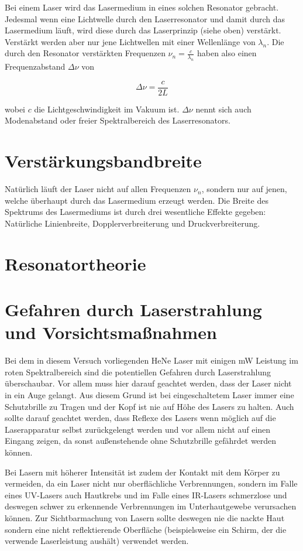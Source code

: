 \documentclass[bigchapter,colorback,accentcolor=tud4b,linedtoc,11pt]{tudreport}
\numberwithin{equation}{subsection}
\begin{document}
Bei einem Laser wird das Lasermedium in eines solchen Resonator gebracht. Jedesmal wenn eine Lichtwelle durch den Laserresonator und damit durch das Lasermedium läuft, wird diese durch das Laserprinzip (siehe oben) verstärkt. Verstärkt werden aber nur jene Lichtwellen mit einer Wellenlänge von \(\lambda_n\). Die durch den Resonator verstärkten Frequenzen \(\nu_n = \frac{c}{\lambda_n}\) haben also einen Frequenzabstand \(\Delta\nu\) von

$$ \Delta\nu = \frac{c}{2L} $$

wobei $c$ die Lichtgeschwindigkeit im Vakuum ist. \(\Delta\nu\) nennt sich auch Modenabstand oder freier Spektralbereich des Laserresonators.

\section{Verstärkungsbandbreite}

Natürlich läuft der Laser nicht auf allen Frequenzen $\nu_n$, sondern nur auf jenen, welche überhaupt durch das Lasermedium erzeugt werden. Die Breite des Spektrums des Lasermediums ist durch drei wesentliche Effekte gegeben: Natürliche Linienbreite, Dopplerverbreiterung und Druckverbreiterung.




\section{Resonatortheorie}

\section{Gefahren durch Laserstrahlung und Vorsichtsmaßnahmen}
Bei dem in diesem Versuch vorliegenden HeNe Laser mit einigen mW Leistung im roten Spektralbereich sind die potentiellen Gefahren durch Laserstrahlung überschaubar. Vor allem muss hier darauf geachtet werden, dass der Laser nicht in ein Auge gelangt. Aus diesem Grund ist bei eingeschaltetem Laser immer eine Schutzbrille zu Tragen und der Kopf ist nie auf Höhe des Lasers zu halten. Auch sollte darauf geachtet werden, dass Reflexe des Lasers wenn möglich auf die Laserapparatur selbst zurückgelengt werden und vor allem nicht auf einen Eingang zeigen, da sonst außenstehende ohne Schutzbrille gefährdet werden können.

Bei Lasern mit höherer Intensität ist zudem der Kontakt mit dem Körper zu vermeiden, da ein Laser nicht nur oberflächliche Verbrennungen, sondern im Falle eines UV-Lasers auch Hautkrebs und im Falle eines IR-Lasers schmerzlose und deswegen schwer zu erkennende Verbrennungen im Unterhautgewebe verursachen können. Zur Sichtbarmachung von Lasern sollte deswegen nie die nackte Haut sondern eine nicht reflektierende Oberfläche (beispielsweise ein Schirm, der die verwende Laserleistung aushält) verwendet werden.
\end{document}

